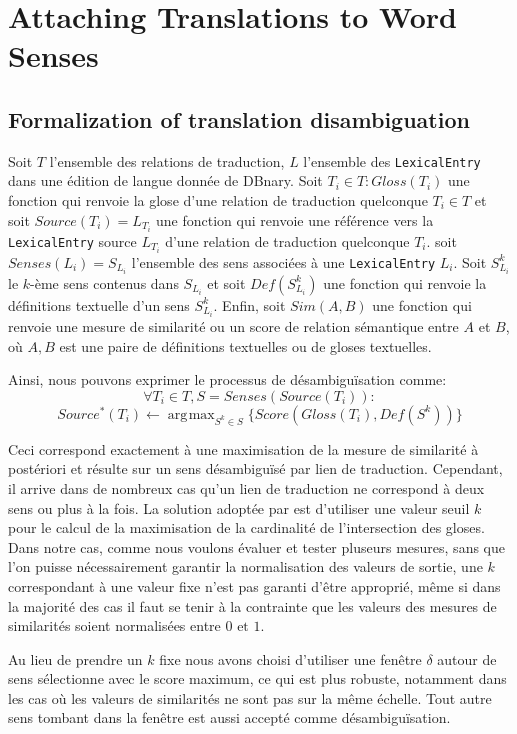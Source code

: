 \documentclass[10pt,a4paper,twoside]{article}
\DeclareMathOperator*{\argmax}{arg\!\max}
\begin{document}
\section{Attaching Translations to Word Senses}
\subsection{Formalization of translation disambiguation}
Soit \(T\) l'ensemble des relations de traduction, \(L\) l'ensemble des \verb|LexicalEntry| dans une édition de langue donnée de DBnary. Soit \(T_i\in T: Gloss(T_i)\) une fonction qui renvoie la glose d'une relation de traduction quelconque \(T_i\in T\) et soit \(Source(T_i)=L_{T_i}\) une fonction qui renvoie une référence vers la \verb|LexicalEntry| source \(L_{T_i}\) d'une relation de traduction quelconque \(T_i\). soit \(Senses(L_i)=S_{L_i}\) l'ensemble des sens associées à une  \verb|LexicalEntry| \(L_i\). Soit \(S_{L_i}^k\) le \(k\)-ème sens contenus dans \(S_{L_i}\) et soit \(Def(S_{L_i}^k)\) une fonction qui renvoie la définitions textuelle d'un sens  \(S_{L_i}^k\). Enfin, soit \(Sim(A,B)\) une fonction qui renvoie  une mesure de similarité ou un score de relation sémantique  entre \(A\) et \(B\), où \(A,B\) est une paire de définitions textuelles ou de gloses textuelles. 

Ainsi, nous pouvons exprimer le processus de désambiguïsation comme:
\[
\forall T_i \in T, S=Senses(Source(T_i)): 
\]
\[
Source^*(T_i) \leftarrow  \argmax_{S^k\in S} \{Score(Gloss(T_i),Def(S^k))\}
\]

Ceci correspond exactement à une maximisation de la mesure de similarité à postériori et résulte sur un sens désambiguïsé par lien de traduction. Cependant, il arrive dans de nombreux cas qu'un lien de traduction ne correspond à deux sens ou plus à la fois. La solution adoptée par \cite{MeyerGurevych:oup2012} est d'utiliser une valeur seuil \(k\) pour le calcul de la maximisation de la cardinalité de l'intersection des gloses. Dans notre cas, comme nous voulons évaluer et tester pluseurs mesures, sans que l'on puisse nécessairement garantir la normalisation des valeurs de sortie, une \(k\) correspondant à une valeur fixe n'est pas garanti d'être approprié, même si dans la majorité des cas il faut se tenir à la contrainte que les valeurs des mesures de similarités soient normalisées entre  \(0 \mbox{ et  } 1\).

Au lieu de prendre un \(k\) fixe nous avons choisi d'utiliser une fenêtre \(\delta\) autour de sens sélectionne avec le score maximum, ce qui est plus robuste, notamment dans les cas où les valeurs de similarités ne sont pas sur la même échelle. Tout autre sens tombant dans la fenêtre est aussi accepté comme désambiguïsation.  
\end{document}
